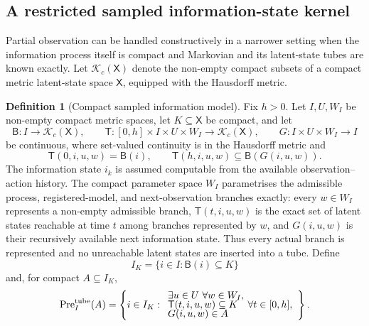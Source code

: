 \documentclass[11pt]{article}
\theoremstyle{definition}
\newtheorem{definition}{Definition}
\newcommand{\Pre}{\operatorname{Pre}}
\begin{document}
\subsection{A restricted sampled information-state kernel}

Partial observation can be handled constructively in a narrower setting when the information process itself is compact and Markovian and its latent-state tubes are known exactly. Let $\mathcal K_c(\mathsf X)$ denote the non-empty compact subsets of a compact metric latent-state space $\mathsf X$, equipped with the Hausdorff metric.

\begin{definition}[Compact sampled information model]
Fix $h>0$. Let $I,U,W_I$ be non-empty compact metric spaces, let $K\subseteq \mathsf X$ be compact, and let
\[
\mathsf B:I\to\mathcal K_c(\mathsf X),
\qquad
\mathsf T:[0,h]\times I\times U\times W_I\to\mathcal K_c(\mathsf X),
\qquad
G:I\times U\times W_I\to I
\]
be continuous, where set-valued continuity is in the Hausdorff metric and
\[
\mathsf T(0,i,u,w)=\mathsf B(i),
\qquad
\mathsf T(h,i,u,w)\subseteq\mathsf B(G(i,u,w)).
\]
The information state $i_k$ is assumed computable from the available observation--action history. The compact parameter space $W_I$ parametrises the admissible process, registered-model, and next-observation branches exactly: every $w\in W_I$ represents a non-empty admissible branch, $\mathsf T(t,i,u,w)$ is the exact set of latent states reachable at time $t$ among branches represented by $w$, and $G(i,u,w)$ is their recursively available next information state. Thus every actual branch is represented and no unreachable latent states are inserted into a tube. Define
\[
I_K=\{i\in I:\mathsf B(i)\subseteq K\}
\]
and, for compact $A\subseteq I_K$,
\begin{equation}
\Pre_I^{\rm tube}(A)=
\left\{i\in I_K:\begin{array}{l}
\exists u\in U\ \forall w\in W_I,\\[-1mm]
\mathsf T(t,i,u,w)\subseteq K\quad\forall t\in[0,h],\\[-1mm]
G(i,u,w)\in A
\end{array}\right\}.
\label{eq:information-predecessor}
\end{equation}
\end{definition}
\end{document}
